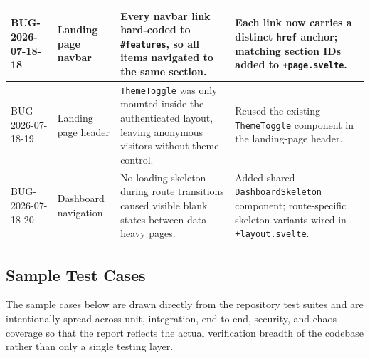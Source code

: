 \documentclass[12pt,a4paper]{article}
\begin{document}
\begin{center}
\begin{longtable}{|>{\RaggedRight\arraybackslash}p{1.9cm}|>{\RaggedRight\arraybackslash}p{2.0cm}|>{\RaggedRight\arraybackslash}p{3.9cm}|>{\RaggedRight\arraybackslash}p{3.8cm}|}
BUG-2026-07-18-18 &
  Landing page navbar &
  Every navbar link hard-coded to \texttt{\#features}, so all items navigated to the same section. &
  Each link now carries a distinct \texttt{href} anchor; matching section IDs added to \texttt{+page.svelte}. \\
\hline

BUG-2026-07-18-19 &
  Landing page header &
  \texttt{ThemeToggle} was only mounted inside the authenticated layout, leaving anonymous visitors without theme control. &
  Reused the existing \texttt{ThemeToggle} component in the landing-page header. \\
\hline

BUG-2026-07-18-20 &
  Dashboard navigation &
  No loading skeleton during route transitions caused visible blank states between data-heavy pages. &
  Added shared \texttt{DashboardSkeleton} component; route-specific skeleton variants wired in \texttt{+layout.svelte}. \\
\hline

\end{longtable}
\end{center}

\subsection{Sample Test Cases}

The sample cases below are drawn directly from the repository test suites and
are intentionally spread across unit, integration, end-to-end, security, and
chaos coverage so that the report reflects the actual verification breadth of
the codebase rather than only a single testing layer.
\end{document}
